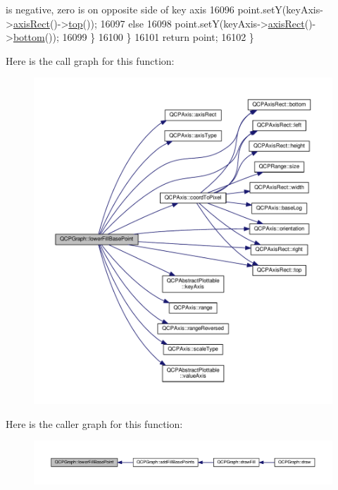 \begin{DoxyCode}
{       is negative, zero is on opposite side of key axis}
16096         point.setY(keyAxis->\hyperlink{class_q_c_p_axis_aada3102af43b029e3879bcbf2bddfabb}{axisRect}()->\hyperlink{class_q_c_p_axis_rect_ac45aef1eb75cea46b241b6303028a607}{top}());
16097       \textcolor{keywordflow}{else}
16098         point.setY(keyAxis->\hyperlink{class_q_c_p_axis_aada3102af43b029e3879bcbf2bddfabb}{axisRect}()->\hyperlink{class_q_c_p_axis_rect_af2b5982ebe7e6f781b9bf1cc371a60d8}{bottom}());
16099     \}
16100   \}
16101   \textcolor{keywordflow}{return} point;
16102 \}
\end{DoxyCode}


Here is the call graph for this function\+:\nopagebreak
\begin{figure}[H]
\begin{center}
\leavevmode
\includegraphics[width=350pt]{class_q_c_p_graph_a41f982e8ceaefe6a53eb7432f26d64b6_cgraph}
\end{center}
\end{figure}




Here is the caller graph for this function\+:\nopagebreak
\begin{figure}[H]
\begin{center}
\leavevmode
\includegraphics[width=350pt]{class_q_c_p_graph_a41f982e8ceaefe6a53eb7432f26d64b6_icgraph}
\end{center}
\end{figure}


